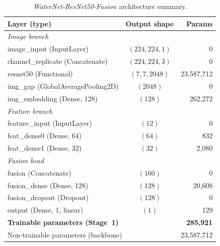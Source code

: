 \begin{table}[htbp]
    \caption{\textit{WaterNet-ResNet50-Fusion} architecture summary.}
    \begin{center}
        \small
        \begin{tabular}{|l|c|r|}
        \hline
        \textbf{Layer (type)} & \textbf{Output shape} & \textbf{Params} \\
        \hline
        \multicolumn{3}{|l|}{\textit{Image branch}} \\
        \hline
        image\_input (InputLayer)
            & $(224, 224, 1)$ & 0 \\
        channel\_replicate (Concatenate)
            & $(224, 224, 3)$ & 0 \\
        resnet50 (Functional)
            & $(7, 7, 2048)$ & 23{,}587{,}712 \\
        img\_gap (GlobalAveragePooling2D)
            & $(2048)$ & 0 \\
        img\_embedding (Dense, 128)
            & $(128)$ & 262{,}272 \\
        \hline
        \multicolumn{3}{|l|}{\textit{Feature branch}} \\
        \hline
        feature\_input (InputLayer)
            & $(12)$ & 0 \\
        feat\_dense0 (Dense, 64)
            & $(64)$ & 832 \\
        feat\_dense1 (Dense, 32)
            & $(32)$ & 2{,}080 \\
        \hline
        \multicolumn{3}{|l|}{\textit{Fusion head}} \\
        \hline
        fusion (Concatenate)
            & $(160)$ & 0 \\
        fusion\_dense (Dense, 128)
            & $(128)$ & 20{,}608 \\
        fusion\_dropout (Dropout)
            & $(128)$ & 0 \\
        output (Dense, 1, linear)
            & $(1)$ & 129 \\
        \hline
        \multicolumn{2}{|l|}{\textbf{Trainable parameters (Stage~1)}}
            & \textbf{285{,}921} \\
        \hline
        \multicolumn{2}{|l|}{Non-trainable parameters (backbone)}
            & 23{,}587{,}712 \\
        \hline
        \end{tabular}
    \label{tab:rn50_fusion_arch}
    \end{center}
\end{table}

